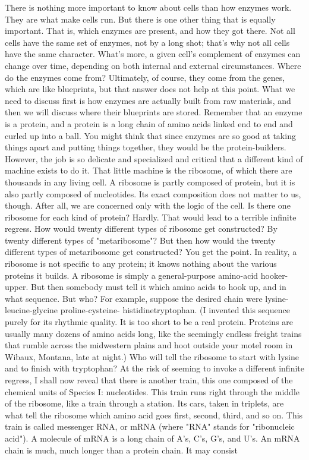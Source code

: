         There is nothing more important to know about cells than how enzymes work.
They are what make cells run. But there is one other thing that is equally important.
That is, which enzymes are present, and how they got there. Not all cells have the
same set of enzymes, not by a long shot; that's why not all cells have the same
character. What's more, a given cell's complement of enzymes can change over time,
depending on both internal and external circumstances. Where do the enzymes come
from? Ultimately, of course, they come from the genes, which are like blueprints, but
that answer does not help at this point. What we need to discuss first is how enzymes
are actually built from raw materials, and then we will discuss where their blueprints
are stored.
        Remember that an enzyme is a protein, and a protein is a long chain of amino
acids linked end to end and curled up into a ball. You might think that since enzymes
are so good at taking things apart and putting things together, they would be the
protein-builders. However, the job is so delicate and specialized and critical that a
different kind of machine exists to do it. That little machine is the ribosome, of which
there are thousands in any living cell. A ribosome is partly composed of protein, but it
is also partly composed of nucleotides. Its exact composition does not matter to us,
though. After all, we are concerned only with the logic of the cell.
        Is there one ribosome for each kind of protein? Hardly. That would lead to a
terrible infinite regress. How would twenty different types of ribosome get
constructed? By twenty different types of "metaribosome"? But then how would the
twenty different types of metaribosome get constructed? You get the point. In reality,
a ribosome is not specific to any protein; it knows nothing about the various proteins
it builds. A ribosome is simply a general-purpose amino-acid hooker-upper. But then
somebody must tell it which amino acids to hook up, and in what sequence. But who?
For example, suppose the desired chain were lysine-leucine-glycine proline-cysteine-
histidinetryptophan. (I invented this sequence purely for its rhythmic quality. It is too
short to be a real protein. Proteins are usually many dozens of amino acids long, like
the seemingly endless freight trains that rumble across the midwestern plains and hoot
outside your motel room in Wibaux, Montana, late at night.) Who will tell the
ribosome to start with lysine and to finish with tryptophan?
        At the risk of seeming to invoke a different infinite regress, I shall now reveal
that there is another train, this one composed of the chemical units of Species I:
nucleotides. This train runs right through the middle of the ribosome, like a train
through a station. Its cars, taken in triplets, are what tell the ribosome which amino
acid goes first, second, third, and so on. This train is called messenger RNA, or
mRNA (where "RNA" stands for "ribonucleic acid"). A molecule of mRNA is a long
chain of A's, C's, G's, and U's. An mRNA chain is much, much longer than a protein
chain. It may consist




